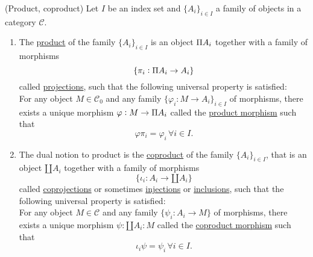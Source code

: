 \begin{definition}{(Product, coproduct)}\label{def:prod_coprod}
Let $I$ be an index set and $\{A_{i}\}_{i\in I}$ a family of objects in a category $\mathcal{C}$.
\begin{enumerate}
\renewcommand{\labelenumi}{(prod)}
\item The \ul{product} of the family $\{A_{i}\}_{i\in I}$ is an object $\invamalg A_{i}$ together with a family of morphisms
\[
\{ \pi_{i} : \invamalg A_{i} \rightarrow A_{i} \}
\]
called \ul{projections}, such that the following universal property is satisfied:\\
For any object $M \in \mathcal{C}_{0}$ and any family $\{ \varphi_{i} : M \rightarrow A_{i} \}_{i\in I}$ of morphisms, there exists
a unique morphism $\varphi : M \rightarrow \invamalg A_{i}$ called the \ul{product morphism} such that
\[
\varphi \pi_{i} = \varphi_{i} \, \forall i \in I.
\]
\renewcommand{\labelenumi}{(coprod)}
\item The dual notion to product is the \ul{coproduct} of the family $\{A_{i}\}_{i\in I}$, that is an object $\amalg A_{i}$ together with
a family of morphisms
\[
\{ \iota_{i} : A_{i} \rightarrow \amalg A_{i} \}
\]
called \ul{coprojections} or sometimes \ul{injections} or \ul{inclusions}, such that the following universal property is satisfied:\\
For any object $M \in \mathcal{C}$ and any family $\{ \psi_{i} : A_{i} \rightarrow M \}$ of morphisms, there exists a unique
morphism $\psi : \amalg A_{i} : M$ called the \ul{coproduct morphism} such that
\[
\iota_{i} \psi = \psi_{i} \, \forall i \in I.
\]
\end{enumerate}
\end{definition}

